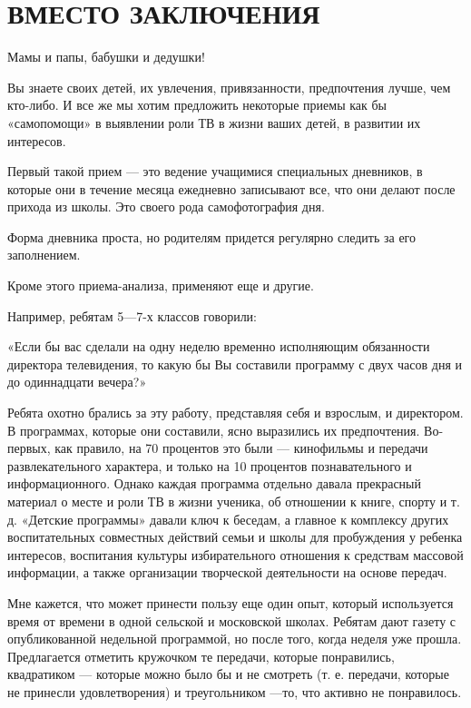 \documentclass[12pt, a4paper, openany]{book}
\begin{document}
\newpage
\section[Вместо заключения]{\center \textbf{ВМЕСТО ЗАКЛЮЧЕНИЯ }}

Мамы и папы, бабушки и дедушки! 

Вы знаете своих детей, их увлечения, привязанности, предпочтения лучше, чем кто-либо. И все же мы хотим предложить некоторые приемы как бы «самопомощи» в выявлении роли ТВ в жизни ваших детей, в развитии их интересов. 

Первый такой прием — это ведение учащимися специальных дневников, в которые они в течение месяца ежедневно записывают все, что они делают после прихода из школы. Это своего рода самофотография дня. 

Форма дневника проста, но родителям придется регулярно следить за его заполнением. 

Кроме этого приема-анализа, применяют еще и другие. 

Например, ребятам 5—7-х классов говорили: 

«Если бы вас сделали на одну неделю временно исполняющим обязанности директора телевидения, то какую бы Вы составили программу с двух часов дня и до одиннадцати вечера?» 

Ребята охотно брались за эту работу, представляя себя и взрослым, и директором. В программах, которые они составили, ясно выразились их предпочтения. Во-первых, как правило, на 70 процентов это были — кинофильмы и передачи развлекательного характера, и только на 10 процентов познавательного и информационного. Однако каждая программа отдельно давала прекрасный материал о месте и роли ТВ в жизни ученика, об отношении к книге, спорту и т. д. «Детские программы» давали ключ к беседам, а главное к комплексу других воспитательных совместных действий семьи и школы для пробуждения у ребенка интересов, воспитания культуры избирательного отношения к средствам массовой информации, а также организации творческой деятельности на основе передач. 

Мне кажется, что может принести пользу еще один опыт, который используется время от времени в одной сельской и московской школах. Ребятам дают газету с опубликованной недельной программой, но после того, когда неделя уже прошла. Предлагается отметить кружочком те передачи, которые понравились, квадратиком — которые можно было бы и не смотреть (т. е. передачи, которые не принесли удовлетворения) и треугольником —то, что активно не понравилось. 
\end{document}
